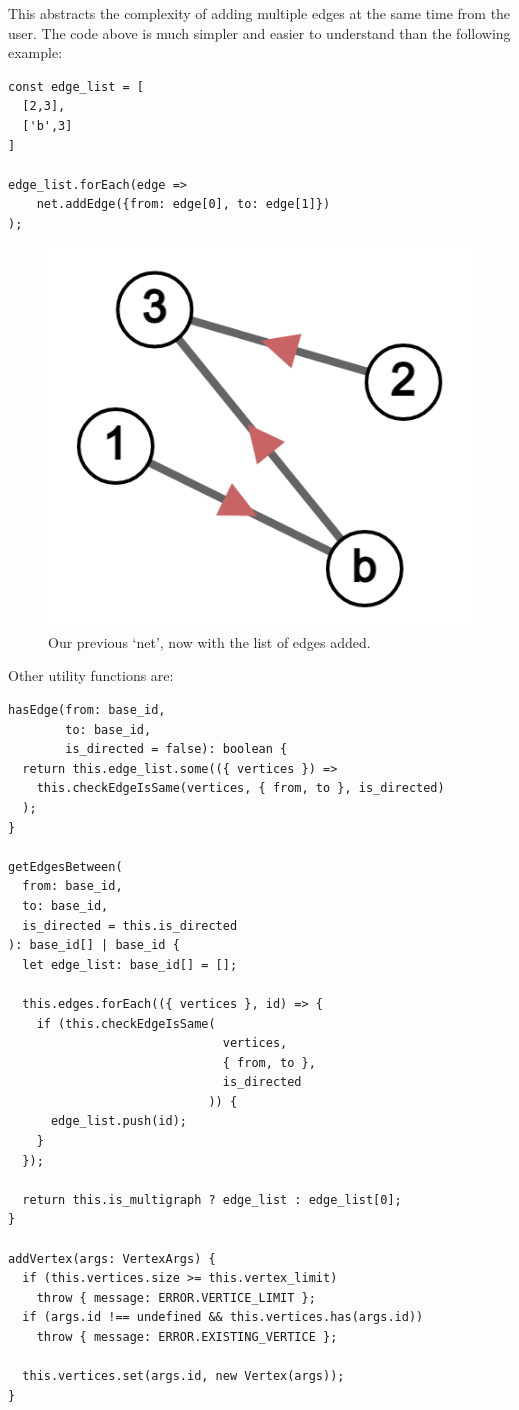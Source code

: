 This abstracts the complexity of adding multiple edges at the same time
from the user.
The code above is much simpler and easier to understand than the
following example:

\begin{verbatim}
const edge_list = [
  [2,3],
  ['b',3]
]

edge_list.forEach(edge =>
    net.addEdge({from: edge[0], to: edge[1]})
);
\end{verbatim}

\begin{figure}[H]
  \includegraphics[scale=.25]{img/net_1b_edge_list.png}
  \caption{Our previous `net', now with the list of edges added.}
  \label{fig:net_edge_list}
\end{figure}

Other utility functions are:

\begin{verbatim}
hasEdge(from: base_id,
        to: base_id,
        is_directed = false): boolean {
  return this.edge_list.some(({ vertices }) =>
    this.checkEdgeIsSame(vertices, { from, to }, is_directed)
  );
}

getEdgesBetween(
  from: base_id,
  to: base_id,
  is_directed = this.is_directed
): base_id[] | base_id {
  let edge_list: base_id[] = [];

  this.edges.forEach(({ vertices }, id) => {
    if (this.checkEdgeIsSame(
                              vertices,
                              { from, to },
                              is_directed
                            )) {
      edge_list.push(id);
    }
  });

  return this.is_multigraph ? edge_list : edge_list[0];
}

addVertex(args: VertexArgs) {
  if (this.vertices.size >= this.vertex_limit)
    throw { message: ERROR.VERTICE_LIMIT };
  if (args.id !== undefined && this.vertices.has(args.id))
    throw { message: ERROR.EXISTING_VERTICE };

  this.vertices.set(args.id, new Vertex(args));
}
\end{verbatim}

